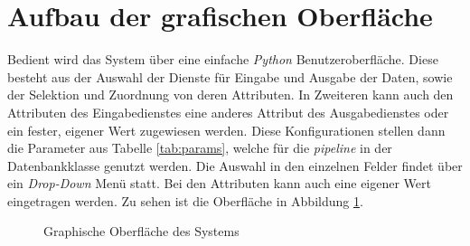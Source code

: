 \newpage
\section{Aufbau der grafischen Oberfläche}

Bedient wird das System über eine einfache \textit{Python} Benutzeroberfläche. Diese besteht aus der Auswahl der Dienste für Eingabe und Ausgabe der Daten, sowie der Selektion und Zuordnung von deren Attributen. In Zweiteren kann auch den Attributen des Eingabedienstes eine anderes Attribut des Ausgabedienstes oder ein fester, eigener Wert zugewiesen werden. Diese Konfigurationen stellen dann die Parameter aus Tabelle \ref{tab:params}, welche für die \textit{pipeline} in der Datenbankklasse genutzt werden. Die Auswahl in den einzelnen Felder findet über ein \textit{Drop-Down} Menü statt. Bei den Attributen kann auch eine eigener Wert eingetragen werden. Zu sehen ist die Oberfläche in Abbildung \ref{fig:gui}. 

\begin{figure}[H]
	\centering
	\caption{Graphische Oberfläche des Systems}
	\label{fig:gui}
\end{figure}